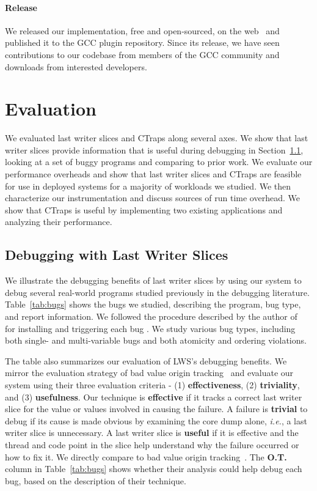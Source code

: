 \documentclass[pageno,nohyperref]{jpaper}
\newcommand{\ctraps}{CTraps\xspace}
\newcommand{\lws}{LWS\xspace}
\begin{document}
\paragraph{Release}
We released our implementation, free and open-sourced, on the
web~\cite{ctrapsrelease} and published it to the GCC plugin repository.
Since its release, we have seen contributions to our codebase from members of
the GCC community and downloads from interested developers.

\section{Evaluation}
\label{sec:eval}
We evaluated last writer slices and \ctraps along several axes.  We show that
last writer slices provide information that is useful during debugging in
Section~\ref{sec:eval:debugging}, looking at a set of buggy programs and
comparing to prior work.  We evaluate our performance overheads and
show that last writer slices and \ctraps are feasible for use in deployed
systems for a majority of workloads we studied.  We then characterize our
instrumentation and discuss sources of run time overhead.   We
show that \ctraps is useful by implementing two existing applications and
analyzing their performance.    

\subsection{Debugging with Last Writer Slices}
\label{sec:eval:debugging}

We illustrate the debugging benefits of last writer slices by using our system
to debug several real-world programs studied previously in the debugging
literature.  Table~\ref{tab:bugs} shows the bugs we studied, describing the
program, bug type, and report information.  We followed the procedure described
by the author of~\cite{concurrencybugs} for installing and triggering each bug
.  We study various bug types, including both single- and
multi-variable bugs and both atomicity and ordering violations.

The table also summarizes our evaluation of \lws's debugging
benefits.  We mirror the evaluation strategy of bad value origin
tracking~\cite{badapples} and evaluate our system using their three
evaluation criteria - (1) {\bf effectiveness}, (2) {\bf triviality}, and (3)
{\bf usefulness}.  Our technique is {\bf effective} if it tracks a correct last
writer slice for the value or values involved in causing the failure.  A failure is {\bf
trivial} to debug if its cause is made obvious by examining the core dump
alone, {\em i.e.}, a last writer slice is unnecessary.  A last writer slice is
{\bf useful} if it is effective and the thread and code point in the slice help
understand why the failure occurred or how to fix it.   We directly compare to
bad value origin tracking~\cite{badapples}.    The {\bf O.T.} column in Table~\ref{tab:bugs}
shows  whether their analysis could help debug each bug, based on the
description of their technique.
\end{document}

